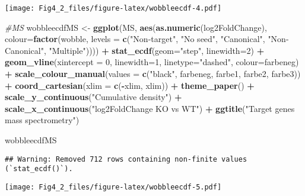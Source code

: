 \documentclass[
]{article}
\newenvironment{Shaded}{\begin{snugshade}}{\end{snugshade}}
\newcommand{\AttributeTok}[1]{\textcolor[rgb]{0.13,0.29,0.53}{#1}}
\newcommand{\CommentTok}[1]{\textcolor[rgb]{0.56,0.35,0.01}{\textit{#1}}}
\newcommand{\DecValTok}[1]{\textcolor[rgb]{0.00,0.00,0.81}{#1}}
\newcommand{\FunctionTok}[1]{\textcolor[rgb]{0.13,0.29,0.53}{\textbf{#1}}}
\newcommand{\NormalTok}[1]{#1}
\newcommand{\OtherTok}[1]{\textcolor[rgb]{0.56,0.35,0.01}{#1}}
\newcommand{\SpecialCharTok}[1]{\textcolor[rgb]{0.81,0.36,0.00}{\textbf{#1}}}
\newcommand{\StringTok}[1]{\textcolor[rgb]{0.31,0.60,0.02}{#1}}
\begin{document}
\texttt{[image: Fig4\_2\_files/figure-latex/wobbleecdf-4.pdf]}

\begin{Shaded}
\begin{Highlighting}[]
\CommentTok{\#MS}
\NormalTok{wobbleecdfMS }\OtherTok{\textless{}{-}} \FunctionTok{ggplot}\NormalTok{(MS, }\FunctionTok{aes}\NormalTok{(}\FunctionTok{as.numeric}\NormalTok{(log2FoldChange), }\AttributeTok{colour=}\FunctionTok{factor}\NormalTok{(wobble, }\AttributeTok{levels =} \FunctionTok{c}\NormalTok{(}\StringTok{"Non{-}target"}\NormalTok{, }\StringTok{"No seed"}\NormalTok{, }\StringTok{"Canonical"}\NormalTok{, }\StringTok{"Non{-}Canonical"}\NormalTok{, }\StringTok{"Multiple"}\NormalTok{)))) }\SpecialCharTok{+} 
  \FunctionTok{stat\_ecdf}\NormalTok{(}\AttributeTok{geom=}\StringTok{"step"}\NormalTok{, }\AttributeTok{linewidth=}\DecValTok{2}\NormalTok{) }\SpecialCharTok{+}
  \FunctionTok{geom\_vline}\NormalTok{(}\AttributeTok{xintercept =} \DecValTok{0}\NormalTok{, }\AttributeTok{linewidth=}\DecValTok{1}\NormalTok{, }\AttributeTok{linetype=}\StringTok{"dashed"}\NormalTok{, }\AttributeTok{colour=}\NormalTok{farbeneg) }\SpecialCharTok{+}
  \FunctionTok{scale\_colour\_manual}\NormalTok{(}\AttributeTok{values =} \FunctionTok{c}\NormalTok{(}\StringTok{"black"}\NormalTok{, farbeneg, farbe1, farbe2, farbe3)) }\SpecialCharTok{+}
  \FunctionTok{coord\_cartesian}\NormalTok{(}\AttributeTok{xlim =} \FunctionTok{c}\NormalTok{(}\SpecialCharTok{{-}}\NormalTok{xlim, xlim)) }\SpecialCharTok{+} 
  \FunctionTok{theme\_paper}\NormalTok{() }\SpecialCharTok{+}
  \FunctionTok{scale\_y\_continuous}\NormalTok{(}\StringTok{"Cumulative density"}\NormalTok{) }\SpecialCharTok{+} \FunctionTok{scale\_x\_continuous}\NormalTok{(}\StringTok{"log2FoldChange KO vs WT"}\NormalTok{) }\SpecialCharTok{+}
  \FunctionTok{ggtitle}\NormalTok{(}\StringTok{"Target genes mass spectrometry"}\NormalTok{)}

\NormalTok{wobbleecdfMS}
\end{Highlighting}
\end{Shaded}

\begin{verbatim}
## Warning: Removed 712 rows containing non-finite values (`stat_ecdf()`).
\end{verbatim}

\texttt{[image: Fig4\_2\_files/figure-latex/wobbleecdf-5.pdf]}
\end{document}

